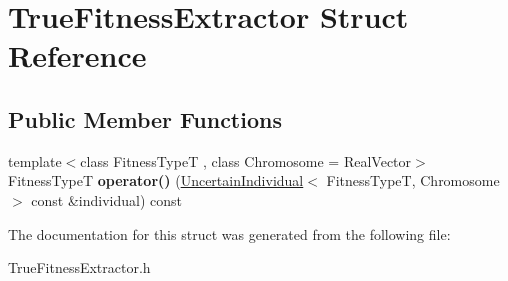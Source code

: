 \hypertarget{structTrueFitnessExtractor}{}\section{True\+Fitness\+Extractor Struct Reference}
\label{structTrueFitnessExtractor}
\subsection*{Public Member Functions}
\begin{DoxyCompactItemize}
\item 
{\footnotesize template$<$class Fitness\+TypeT , class Chromosome  = Real\+Vector$>$ }\\Fitness\+TypeT {\bfseries operator()} (\hyperlink{classUncertainIndividual}{Uncertain\+Individual}$<$ Fitness\+TypeT, Chromosome $>$ const \&individual) const \hypertarget{structTrueFitnessExtractor_ad6082b09e652f9094cd097dcf9d63d3d}{}\label{structTrueFitnessExtractor_ad6082b09e652f9094cd097dcf9d63d3d}

\end{DoxyCompactItemize}


The documentation for this struct was generated from the following file\+:\begin{DoxyCompactItemize}
\item 
True\+Fitness\+Extractor.\+h\end{DoxyCompactItemize}
